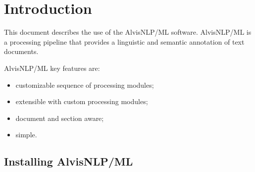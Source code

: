 \documentclass[a4paper]{book}
\begin{document}


\chapter{Introduction}
This document describes the use of the AlvisNLP/ML software.
AlvisNLP/ML is a processing pipeline that provides a linguistic and semantic annotation of text documents.

AlvisNLP/ML key features are:
\begin{itemize}
\item customizable sequence of processing modules;
\item extensible with custom processing modules;
\item document and section aware;
\item simple.
\end{itemize}

\section{Installing AlvisNLP/ML}
\end{document}
